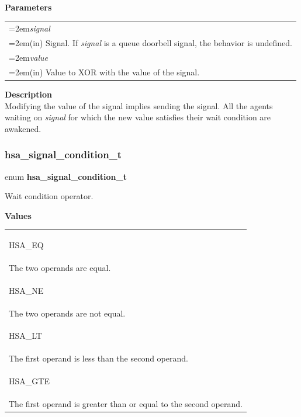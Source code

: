 \documentclass[final]{book}
\newcommand{\hsaarg}[1]{\textit{#1}}
\newcommand{\reftyp}[1]{#1}
\newcommand{\refenu}[1]{\reftyp{#1}}
\newenvironment{mylongtable}{\rowcolors{0}{lightgray}{lightgray}\longtable} {
\endlongtable}
\begin{document}
\noindent\textbf{Parameters}\\[-6mm]
\noindent\begin{longtable}{@{}>{\hangindent=2em}p{\textwidth}}
\hsaarg{signal}\\\hspace{2em}(in) Signal. If \textit{signal} is a queue doorbell signal, the behavior is undefined.\\[2mm]
\hsaarg{value}\\\hspace{2em}(in) Value to XOR with the value of the signal.
\end{longtable}
\vspace{-5mm}\noindent\textbf{Description}\\[1mm]
Modifying the value of the signal implies sending the signal. All the agents waiting on \textit{signal} for which the new value satisfies their wait condition are awakened.








\subsubsection{hsa_\-signal_\-condition_\-t}
\vspace{-5.5mm}\begin{mylongtable}{@{}p{\textwidth}}
\rule{0pt}{3ex}\rule[-2.5ex]{0pt}{0pt}enum \hypertarget{group__signals_1gab7190fcff48c6dbeded341389ed17c8d}{\textbf{hsa_\-signal_\-condition_\-t}}
\end{mylongtable}
\vspace{-2mm}Wait condition operator.

\noindent\textbf{Values}\\[-5mm]
\begin{longtable}{@{\hspace{2em}}p{\linewidth-2em}}
\hspace{-2em}\hypertarget{group__signals_1ggab7190fcff48c6dbeded341389ed17c8daad3556497ba9c0d287d42345baba25d6}{\refenu{HSA_\-EQ}} \\The two operands are equal.\\[2mm]
\hspace{-2em}\hypertarget{group__signals_1ggab7190fcff48c6dbeded341389ed17c8dae595f91b4c0720a4741c6fe4ead6f793}{\refenu{HSA_\-NE}} \\The two operands are not equal.\\[2mm]
\hspace{-2em}\hypertarget{group__signals_1ggab7190fcff48c6dbeded341389ed17c8da02c24632d8b8925649d95f4221b40e15}{\refenu{HSA_\-LT}} \\The first operand is less than the second operand.\\[2mm]
\hspace{-2em}\hypertarget{group__signals_1ggab7190fcff48c6dbeded341389ed17c8da8f171d683f208e4e9794b89f40998547}{\refenu{HSA_\-GTE}} \\The first operand is greater than or equal to the second operand.
\end{longtable}
\end{document}
